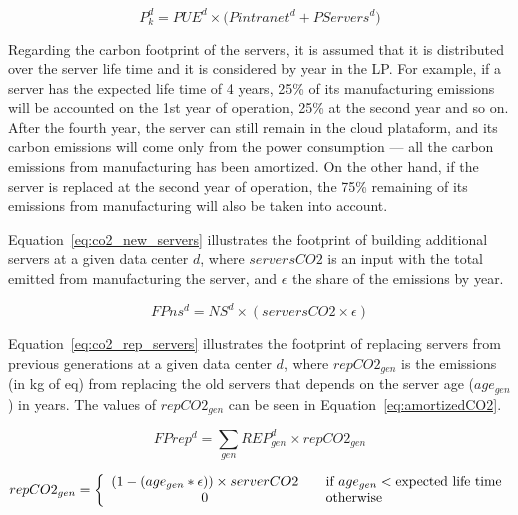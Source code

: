 \begin{equation} \label{eq:power_cons_gen}
   P^d_k  = PUE^d \times \big(  Pintranet^d + PServers^d\big)
\end{equation}


Regarding the carbon footprint of the servers, it is assumed that it is distributed over the server life time and it is considered by year in the LP. For example, if a server has the expected life time of 4 years, 25\% of its manufacturing emissions will be accounted on the 1st year of operation, 25\% at the second year and so on. After the fourth year, the server can still remain in the cloud plataform, and its carbon emissions will come only from the power consumption --- all the carbon emissions from manufacturing has been amortized.  On the other hand, if the server is replaced at the second year of operation, the 75\% remaining of its emissions from manufacturing will also be taken into account.

Equation~\eqref{eq:co2_new_servers} illustrates the footprint of building additional servers at a given data center $d$, where $serversCO2$ is an input with the total  emitted from manufacturing the server, and $\epsilon$ the share of the emissions by year.

\begin{equation} \label{eq:co2_new_servers}
FPns^d = NS^d \times ( serversCO2 \times \epsilon)	
\end{equation}


Equation~\eqref{eq:co2_rep_servers} illustrates the footprint of replacing servers from previous generations at a given data center $d$, where $repCO2_{gen}$ is the emissions (in kg of  eq) from replacing the old servers that depends on the server age ($age_{gen}$) in years. The values of $repCO2_{gen}$ can be seen in Equation~\eqref{eq:amortizedCO2}. 

\begin{equation} \label{eq:co2_rep_servers}
FPrep^d = \sum_{gen} REP_{gen}^d  \times repCO2_{gen}
\end{equation}


\begin{equation} \label{eq:amortizedCO2}
repCO2_{gen} =  \left\{ 
  \begin{array}{ c l }
    (1 - (age_{gen} * \epsilon)) \times serverCO2   & \quad \textrm{if $age_{gen}$}  <  \textrm{expected life time}      \\
    0     & \quad  \textrm{otherwise}   \\
  \end{array}
\right.
\end{equation}


